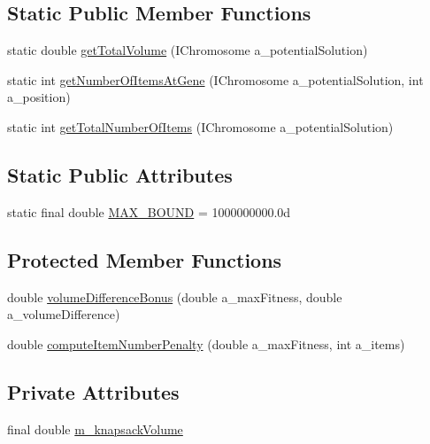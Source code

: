 \subsection*{Static Public Member Functions}
\begin{DoxyCompactItemize}
\item 
static double \hyperlink{classexamples_1_1knapsack_1_1_knapsack_fitness_function_a161d2eb9b204b94ad6f764055905c559}{get\-Total\-Volume} (I\-Chromosome a\-\_\-potential\-Solution)
\item 
static int \hyperlink{classexamples_1_1knapsack_1_1_knapsack_fitness_function_ac53f5254719f0b8ac26ea871edbecca2}{get\-Number\-Of\-Items\-At\-Gene} (I\-Chromosome a\-\_\-potential\-Solution, int a\-\_\-position)
\item 
static int \hyperlink{classexamples_1_1knapsack_1_1_knapsack_fitness_function_a036f9f8d3684828777849e73ff3c650f}{get\-Total\-Number\-Of\-Items} (I\-Chromosome a\-\_\-potential\-Solution)
\end{DoxyCompactItemize}
\subsection*{Static Public Attributes}
\begin{DoxyCompactItemize}
\item 
static final double \hyperlink{classexamples_1_1knapsack_1_1_knapsack_fitness_function_ac8acc4adf78a41b5209d5cd185179c4a}{M\-A\-X\-\_\-\-B\-O\-U\-N\-D} = 1000000000.\-0d
\end{DoxyCompactItemize}
\subsection*{Protected Member Functions}
\begin{DoxyCompactItemize}
\item 
double \hyperlink{classexamples_1_1knapsack_1_1_knapsack_fitness_function_a083c94f14dba01fc8162b7df78aa0409}{volume\-Difference\-Bonus} (double a\-\_\-max\-Fitness, double a\-\_\-volume\-Difference)
\item 
double \hyperlink{classexamples_1_1knapsack_1_1_knapsack_fitness_function_a979b3b045933eaafa8f26d3d3e2b6d76}{compute\-Item\-Number\-Penalty} (double a\-\_\-max\-Fitness, int a\-\_\-items)
\end{DoxyCompactItemize}
\subsection*{Private Attributes}
\begin{DoxyCompactItemize}
\item 
final double \hyperlink{classexamples_1_1knapsack_1_1_knapsack_fitness_function_aadc99ed7dd059c4858f1288d60a6f46f}{m\-\_\-knapsack\-Volume}
\end{DoxyCompactItemize}
